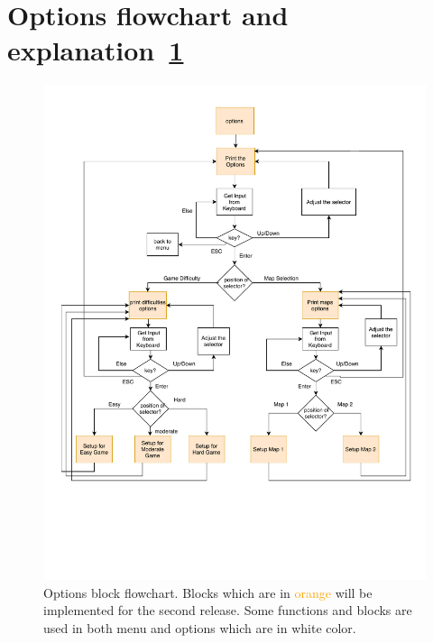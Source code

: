 \section{Options flowchart and explanation~\ref{fig:options}}
\begin{figure}
    \centering 
    \includegraphics[width=\columnwidth]{options.pdf}
    \caption{Options block flowchart. Blocks which are in \textcolor{orange}{orange} will be implemented for the second release. Some functions and blocks are used in both menu and options which are in white color.}
    \label{fig:options}
\end{figure}

